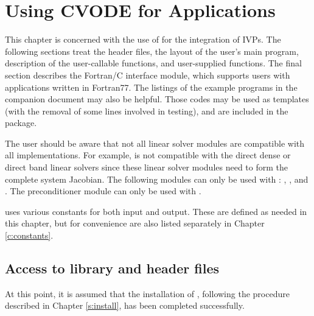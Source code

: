 \chapter{Using CVODE for {\C} Applications}\label{s:simulation}

This chapter is concerned with the use of {\cvode} for the integration
of IVPs.  The following sections treat the header files, the layout of
the user's main program, description of the {\cvode} user-callable
functions, and user-supplied functions.  The final section describes
the Fortran/C interface module, which supports users with applications
written in Fortran77.  The listings of the example programs in the
companion document \cite{cvode2.2.0_ex} may also be helpful.  Those
codes may be used as templates (with the removal of some lines involved
in testing), and are included in the {\cvode} package.

The user should be aware that not all linear solver modules are compatible 
with all {\nvector} implementations. 
For example, {\nvecp} is not compatible with the direct dense or direct band 
linear solvers since these linear solver modules need to form the complete
system Jacobian.  The following {\cvode} modules can only be used with {\nvecs}:
{\cvdense}, {\cvband}, and {\cvbandpre}. The preconditioner module {\cvbbdpre}
can only be used with {\nvecp}.

{\cvode} uses various constants for both input and output.  These are
defined as needed in this chapter, but for convenience are also listed
separately in Chapter \ref{c:constants}.

\section{Access to library and header files}\label{ss:file_access}

At this point, it is assumed that the installation of {\cvode},
following the procedure described in Chapter \ref{s:install}, has
been completed successfully.

